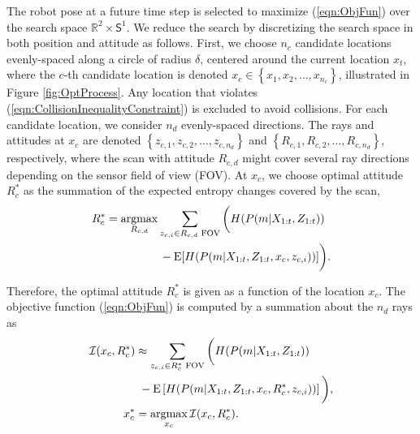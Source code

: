 \documentclass[letterpaper, 10pt, conference]{ieeeconf}
\newcommand{\braces}[1]{\ensuremath{\left\{ #1 \right\}}}
\newcommand{\refeqn}[1]{(\ref{eqn:#1})}
\renewcommand{\Re}{\ensuremath{\mathbb{R}}}
\newcommand{\Sph}{\ensuremath{\mathsf{S}}}
\newcommand{\argmax}{\operatornamewithlimits{argmax}}
\begin{document}
The robot pose at a future time step is selected to maximize \refeqn{ObjFun} over the search space $\Re^2\times\Sph^1$. We reduce the search by discretizing the search space in both position and attitude as follows. First, we choose $n_c$ candidate locations evenly-spaced along a circle of radius $\delta$, centered around the current location $x_t$, where the $c$-th candidate location is denoted $x_c\in\braces{x_1,x_2,\ldots,x_{n_c}}$, illustrated in Figure \ref{fig:OptProcess}. Any location that violates \refeqn{CollisionInequalityConstraint} is excluded to avoid collisions. For each candidate location, we consider $n_d$ evenly-spaced directions. The rays and attitudes at $x_c$ are denoted $\braces{z_{c,1},z_{c,2},\ldots,z_{c,n_d}}$ and $\braces{R_{c,1},R_{c,2},\ldots,R_{c,n_d}}$, respectively, where the scan with attitude $R_{c,d}$ might cover several ray directions depending on the sensor field of view (FOV). At $x_c$, we choose optimal attitude $R_c^*$ as the summation of the expected entropy changes covered by the scan,
\begin{align}
\label{eqn:FindRc}
&R_c^*=\argmax_{R_{c,d}}\sum_{z_{c,i}\in R_{c,d}\text{ FOV}}\bigg(H(P(m|X_{1:t},Z_{1:t}))\nonumber\\&\qquad\quad\quad\quad\quad-\text{E}[H(P(m|X_{1:t},Z_{1:t},x_c,z_{c,i}))]\bigg).
\end{align}


Therefore, the optimal attitude $R_c^*$ is given as a function of the location $x_c$. The objective function \refeqn{ObjFun} is computed by a summation about the $n_d$ rays as %
\begin{align}
\label{eqn:ObjFunApprox}
\mathcal I(x_c,R_c^*)&\approx \sum_{z_{c,i}\in R_{c}^*\text{ FOV}}\bigg(H(P(m|X_{1:t},Z_{1:t}))\nonumber\\&\ -\text{E}\left[H(P(m|X_{1:t},Z_{1:t},x_c,R_c^*,z_{c,i}))\right]\bigg),
\\
x_c^*&=\argmax_{x_c}\mathcal I(x_c,R_c^*).
\end{align}
\end{document}
